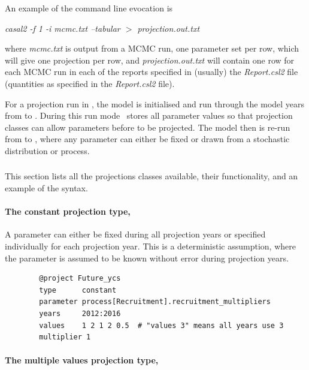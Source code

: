 An example of the command line evocation is

\textit{casal2 -f 1 -i mcmc.txt --tabular $>$ projection.out.txt}

where \textit{mcmc.txt} is output from a MCMC run, one parameter set per row, which will give one projection per row, and \textit{projection.out.txt} will contain one row for each MCMC run in each of the reports specified in (usually) the \textit{Report.csl2} file (quantities as specified in the \textit{Report.csl2} file).

For a projection run in \CNAME, the model is initialised and run through the model years from  to . During this run mode \CNAME\ stores all parameter values so that projection classes can allow parameters before  to be projected. The model then is re-run from  to , where any parameter can either be fixed or drawn from a stochastic distribution or process.


\subsubsection{\label{sec:ProjectionMethods}}

This section lists all the projections classes available, their functionality, and an example of the syntax.

\paragraph[Constant]{The constant projection type, }\label{sec:Project-Constant}

A parameter can either be fixed during all projection years or specified individually for each projection year. This is a deterministic assumption, where the parameter is assumed to be known without error during projection years.

{\small{\begin{verbatim}
		@project Future_ycs
		type      constant
		parameter process[Recruitment].recruitment_multipliers
		years     2012:2016
		values    1 2 1 2 0.5  # "values 3" means all years use 3
		multiplier 1
		\end{verbatim}}}


\paragraph[Multiple Values]{The multiple values projection type, }\label{sec:Project-MultipleValues}

